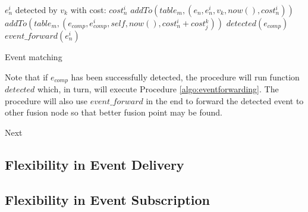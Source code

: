 \begin{algorithm}
\begin{algorithmic}
\REQUIRE \(e_n^i\) detected by \(v_k\) with cost: \(cost_n^i\)
	\STATE \(addTo(table_m, (e_n, e_n^i, v_k, now(), cost_n^i))\)
					\STATE \(addTo(table_m, (e_{comp}, e_{comp}^i, self, now(), cost_n^i+cost_j^k))\)
					\STATE \(detected(e_{comp})\)
				\ENDIF
			\ENDFOR
		\ENDIF
	\ENDFOR
	\STATE \(event\_forward(e_n^i)\)
\end{algorithmic}
\caption{Event matching}
\label{algo:eventmatching}
\end{algorithm}

Note that if \(e_{comp}\) has been successfully detected, the procedure will run function \(detected\) which, in turn, will execute Procedure \ref{algo:eventforwarding}. The procedure will also use \(event\_forward\) in the end to forward the detected event to other fusion node so that better fusion point may be found.

Next 
\subsection{Flexibility in Event Delivery}

\subsection{Flexibility in Event Subscription}